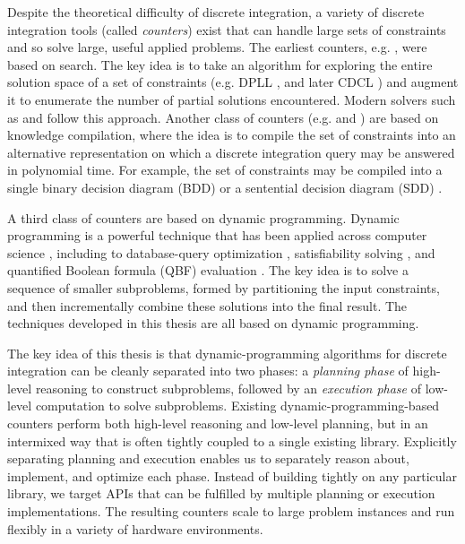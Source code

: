 Despite the theoretical difficulty of discrete integration, a variety of discrete integration tools (called \emph{counters}) exist that can handle large sets of constraints and so solve large, useful applied problems. The earliest counters, e.g.  \cite{birnbaum1999good}, were based on search.
The key idea is to take an algorithm for exploring the entire solution space of a set of constraints (e.g. DPLL \cite{davis1960computing,davis1962machine}, and later CDCL \cite{biere2009conflict}) and augment it to enumerate the number of partial solutions encountered. 
Modern solvers such as  \cite{SBK05} and  \cite{Thurley2006} follow this approach.
Another class of counters (e.g.  \cite{OD15} and  \cite{LM17}) are based on knowledge compilation, where the idea is to compile the set of constraints into an alternative representation on which a discrete integration query may be answered in polynomial time.
For example, the set of constraints may be compiled into a single binary decision diagram (BDD) \cite{akers1978binary} or a sentential decision diagram (SDD) \cite{darwiche2011sdd}.

A third class of counters \cite{CW16,FHMW17,FHWZ18,FHZ19,DPV20,phan2019weighted,fichte2020exploiting} are based on dynamic programming.
Dynamic programming is a powerful technique that has been applied across computer science \cite{bellman1966dynamic}, including to database-query optimization \cite{MPPV04}, satisfiability solving \cite{uribe1994ordered,aguirre2001random,pan2005symbolic}, and quantified Boolean formula (QBF) evaluation \cite{charwat2016bdd}.
The key idea is to solve a sequence of smaller subproblems, formed by partitioning the input constraints, and then incrementally combine these solutions into the final result.
The techniques developed in this thesis are all based on dynamic programming.

The key idea of this thesis is that dynamic-programming algorithms for discrete integration can be cleanly separated into two phases: a \emph{planning phase} of high-level reasoning to construct subproblems, followed by an \emph{execution phase} of low-level computation to solve subproblems.
Existing dynamic-programming-based counters perform both high-level reasoning and low-level planning, but in an intermixed way that is often tightly coupled to a single existing library.
Explicitly separating planning and execution enables us to separately reason about, implement, and optimize each phase.
Instead of building tightly on any particular library, we target APIs that can be fulfilled by multiple planning or execution implementations.
The resulting counters scale to large problem instances and run flexibly in a variety of hardware environments.

